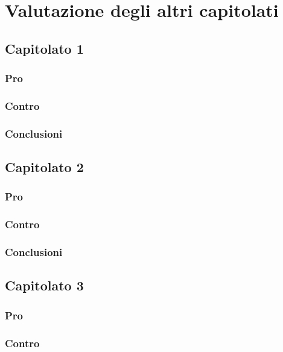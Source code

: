 \section{Valutazione degli altri capitolati}

\subsection{Capitolato 1}

\subsubsection{Pro}

\subsubsection{Contro}

\subsubsection{Conclusioni}

\subsection{Capitolato 2}

\subsubsection{Pro}

\subsubsection{Contro}

\subsubsection{Conclusioni}


\subsection{Capitolato 3}

\subsubsection{Pro}

\subsubsection{Contro}

